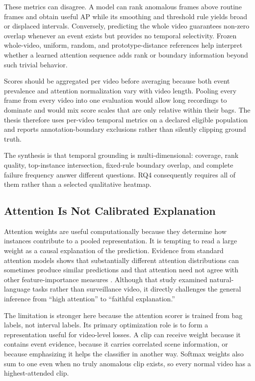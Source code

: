 These metrics can disagree. A model can rank anomalous frames above routine
frames and obtain useful AP while its smoothing and threshold rule yields broad
or displaced intervals. Conversely, predicting the whole video guarantees
non-zero overlap whenever an event exists but provides no temporal selectivity.
Frozen whole-video, uniform, random, and prototype-distance references help
interpret whether a learned attention sequence adds rank or boundary information
beyond such trivial behavior.

Scores should be aggregated per video before averaging because both event
prevalence and attention normalization vary with video length. Pooling every
frame from every video into one evaluation would allow long recordings to
dominate and would mix score scales that are only relative within their bags.
The thesis therefore uses per-video temporal metrics on a declared eligible
population and reports annotation-boundary exclusions rather than silently
clipping ground truth.

The synthesis is that temporal grounding is multi-dimensional: coverage, rank
quality, top-instance intersection, fixed-rule boundary overlap, and complete
failure frequency answer different questions. RQ4 consequently requires all of
them rather than a selected qualitative heatmap.

\subsection{Attention Is Not Calibrated Explanation}

Attention weights are useful computationally because they determine how
instances contribute to a pooled representation. It is tempting to read a large
weight as a causal explanation of the prediction. Evidence from standard
attention models shows that substantially different attention distributions can
sometimes produce similar predictions and that attention need not agree with
other feature-importance measures \cite{jain2019attention}. Although that study
examined natural-language tasks rather than surveillance video, it directly
challenges the general inference from ``high attention'' to ``faithful
explanation.''

The limitation is stronger here because the attention scorer is trained from
bag labels, not interval labels. Its primary optimization role is to form a
representation useful for video-level losses. A clip can receive weight because
it contains event evidence, because it carries correlated scene information, or
because emphasizing it helps the classifier in another way. Softmax weights also
sum to one even when no truly anomalous clip exists, so every normal video has a
highest-attended clip.

